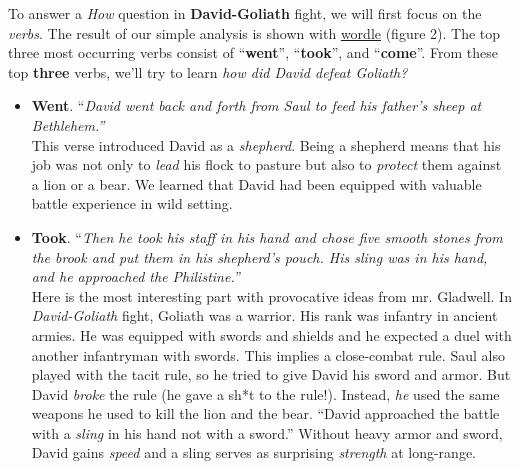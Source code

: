 \documentclass{article}
\begin{document}
\begin{multicols}{2}
To answer a \textit{How} question in \textbf{David-Goliath} fight, we will first focus on the \textit{verbs}.
The result of our simple analysis is shown with \href{http://www.wordle.net/}{wordle} (figure 2).
The top three most occurring verbs consist of ``\textbf{went}'', ``\textbf{took}'', and ``\textbf{come}''. 
From these top \textbf{three} verbs, we'll try to learn \textit{how did David defeat Goliath?}

\begin{itemize}
    \item \textbf{Went}. {``\small \textit{David went back and forth from Saul to feed his father's sheep at Bethlehem.''}}\\
        This verse introduced David as a \textit{shepherd}. 
        Being a shepherd means that his job was not only to \textit{lead} his flock to pasture but also to \textit{protect} them against a lion or a bear.
        We learned that David had been equipped with valuable battle experience in wild setting. 

      \item \textbf{Took}. {``\small \textit{Then he took his staff in his hand and chose five smooth stones from the brook and put them in his shepherd's pouch. His sling was in his hand, and he approached the Philistine.''}}\\
          Here is the most interesting part with provocative ideas from mr. Gladwell. 
          In \textit{David-Goliath} fight, 
          Goliath was a warrior. His rank was infantry in ancient armies.
          He was equipped with swords and shields and he expected a duel with another infantryman with swords.  
          This implies a close-combat rule.
          Saul also played with the tacit rule, so he tried to give David his sword and armor. 
          But David \textit{broke} the rule (he gave a sh*t to the rule!).  
          Instead, \textit{he} used the same weapons he used to kill the lion and the bear.
          ``David approached the battle with a \textit{sling} in his hand not with a sword.''
          Without heavy armor and sword, David gains \textit{speed} and a sling serves as surprising \textit{strength} at long-range.



\end{itemize}
\end{multicols}
\end{document}
